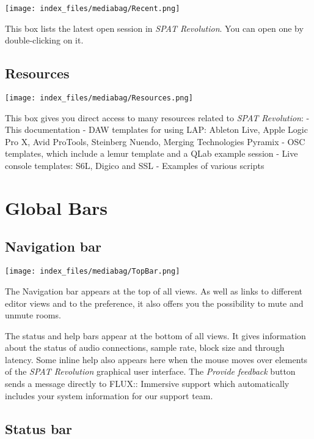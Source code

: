 \documentclass[
  letterpaper,
  DIV=11,
  numbers=noendperiod]{scrreport}
\begin{document}
\texttt{[image: index\_files/mediabag/Recent.png]}

This box lists the latest open session in \emph{SPAT Revolution}. You
can open one by double-clicking on it.

\hypertarget{resources}{%
\section{Resources}\label{resources}}

\texttt{[image: index\_files/mediabag/Resources.png]}

This box gives you direct access to many resources related to \emph{SPAT
Revolution}: - This documentation - DAW templates for using LAP: Ableton
Live, Apple Logic Pro X, Avid ProTools, Steinberg Nuendo, Merging
Technologies Pyramix - OSC templates, which include a lemur template and
a QLab example session - Live console templates: S6L, Digico and SSL -
Examples of various scripts

\hypertarget{global-bars}{%
\chapter{Global Bars}\label{global-bars}}

\hypertarget{navigation-bar}{%
\section{Navigation bar}\label{navigation-bar}}

\texttt{[image: index\_files/mediabag/TopBar.png]}

The Navigation bar appears at the top of all views. As well as links to
different editor views and to the preference, it also offers you the
possibility to mute and unmute rooms.

The status and help bars appear at the bottom of all views. It gives
information about the status of audio connections, sample rate, block
size and through latency. Some inline help also appears here when the
mouse moves over elements of the \emph{SPAT Revolution} graphical user
interface. The \emph{Provide feedback} button sends a message directly
to FLUX:: Immersive support which automatically includes your system
information for our support team.

\hypertarget{status-bar}{%
\section{Status bar}\label{status-bar}}
\end{document}
